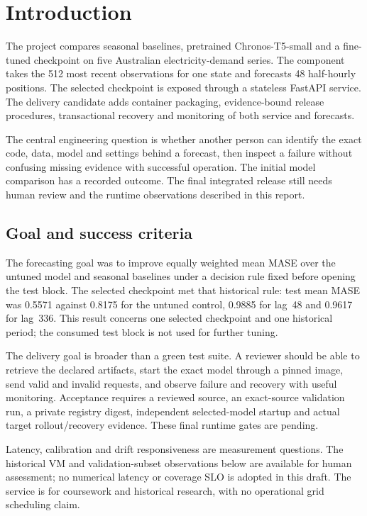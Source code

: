 \documentclass[a4paper,11pt]{article}
\begin{document}
\section{Introduction}

The project compares seasonal baselines, pretrained Chronos-T5-small and a
fine-tuned checkpoint on five Australian electricity-demand series. The component
takes the 512 most recent observations for one state and forecasts 48 half-hourly
positions. The selected checkpoint is exposed through a stateless FastAPI service.
The delivery candidate adds container packaging, evidence-bound release
procedures, transactional recovery and monitoring of both service and forecasts.

The central engineering question is whether another person can identify the
exact code, data, model and settings behind a forecast, then inspect a failure
without confusing missing evidence with successful operation. The initial model
comparison has a recorded outcome. The final integrated release still needs
human review and the runtime observations described in this report.

\subsection{Goal and success criteria}

The forecasting goal was to improve equally weighted mean MASE over the untuned
model and seasonal baselines under a decision rule fixed before opening the test
block. The selected checkpoint met that historical rule: test mean MASE was
0.5571 against 0.8175 for the untuned control, 0.9885 for lag~48 and 0.9617 for
lag~336. This result concerns one selected checkpoint and one historical period;
the consumed test block is not used for further tuning.

The delivery goal is broader than a green test suite. A reviewer should be able
to retrieve the declared artifacts, start the exact model through a pinned image,
send valid and invalid requests, and observe failure and recovery with useful
monitoring. Acceptance requires a reviewed source, an exact-source validation
run, a private registry digest, independent selected-model startup and actual
target rollout/recovery evidence. These final runtime gates are pending.

Latency, calibration and drift responsiveness are measurement questions. The
historical VM and validation-subset observations below are available for human
assessment; no numerical latency or coverage SLO is adopted in this draft.
The service is for coursework and historical research, with no operational grid
scheduling claim.
\end{document}
